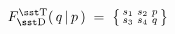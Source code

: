 \begin{equation}
F_{\rm\sst D}^{\rm\sst T}(\,q\,|\,p\,)\;=\;\big\{\begin{smallmatrix}
s_1 & s_2 & p \\ s_3 & s_4 & q \end{smallmatrix}\big\}
\end{equation}

